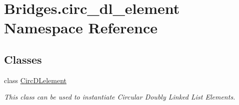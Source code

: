 \hypertarget{namespace_bridges_1_1circ__dl__element}{}\section{Bridges.\+circ\+\_\+dl\+\_\+element Namespace Reference}
\label{namespace_bridges_1_1circ__dl__element}
\subsection*{Classes}
\begin{DoxyCompactItemize}
\item 
class \hyperlink{class_bridges_1_1circ__dl__element_1_1_circ_d_lelement}{Circ\+D\+Lelement}
\begin{DoxyCompactList}\small\item\em This class can be used to instantiate Circular Doubly Linked List Elements. \end{DoxyCompactList}\end{DoxyCompactItemize}
